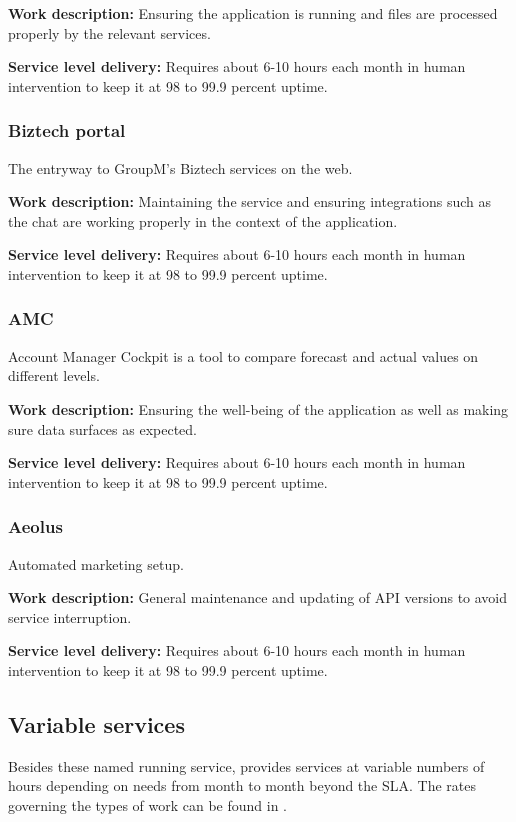 \textbf{Work description:} Ensuring the application is running and files are processed properly by the relevant services.

\textbf{Service level delivery:} Requires about 6-10 hours each month in human intervention to keep it at 98 to 99.9 percent uptime. 

\subsubsection{Biztech portal}
The entryway to GroupM's Biztech services on the web.

\textbf{Work description:} Maintaining the service and ensuring integrations such as the chat are working properly in the context of the application.

\textbf{Service level delivery:} Requires about 6-10 hours each month in human intervention to keep it at 98 to 99.9 percent uptime.

\subsubsection{AMC}
Account Manager Cockpit is a tool to compare forecast and actual values on different levels.

\textbf{Work description:} Ensuring the well-being of the application as well as making sure data surfaces as expected.

\textbf{Service level delivery:} Requires about 6-10 hours each month in human intervention to keep it at 98 to 99.9 percent uptime.

\subsubsection{Aeolus}
Automated marketing setup.

\textbf{Work description:} General maintenance and updating of API versions to avoid service interruption.

\textbf{Service level delivery:} Requires about 6-10 hours each month in human intervention to keep it at 98 to 99.9 percent uptime.

\subsection{Variable services}
Besides these named running service, \suppliername provides services at variable numbers of hours depending on \customername needs from month to month beyond the SLA. The rates governing the types of work can be found in .

